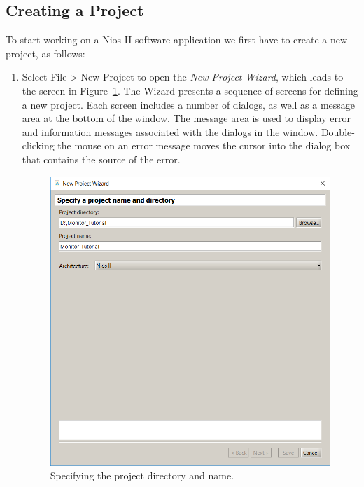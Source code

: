 \documentclass[11pt, twoside, pdftex]{article}
\begin{document}
\subsection{Creating a Project}
\label{sec:new_project}

To start working on a Nios II software application we first have
to create a new project, as follows: 
\begin{enumerate}
\item
Select {\sf File > New Project} to open the
{\it New Project Wizard}, which leads to the screen 
in Figure~\ref{fig:5}. The Wizard presents a sequence of screens for
defining a new project. Each screen includes a number of dialogs, as well as a message area at the bottom of the window.  
The message area is used to display error and information messages associated with the dialogs in the window. 
Double-clicking the mouse on an error message moves the cursor
into the dialog box that contains the source of the error.

\begin{figure}[H]
   \begin{center}
      \includegraphics[scale=0.5]{screenshots/figure5.png}
   \end{center}
   \caption{Specifying the project directory and name.} 
	 \label{fig:5}
\end{figure}


\end{enumerate}
\end{document}
